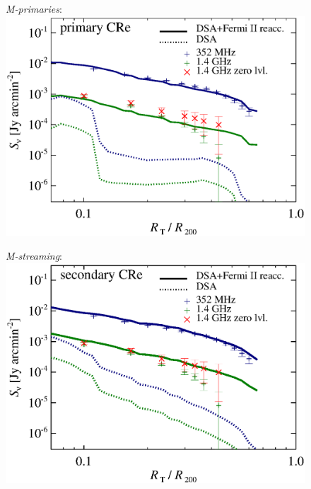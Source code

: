 \documentclass[useAMS,usenatbib]{mn2e}
\newcommand{\Mstream}{{\it M-streaming}\xspace}
\newcommand{\Mprimary}{{\it M-primaries}\xspace}
\begin{document}
\begin{figure}
\begin{minipage}{1\columnwidth}
   \begin{center}\Large{\Mprimary:}\\
     \includegraphics[width=\columnwidth]{figures/sbright.nu.DIIcomp.Pri.g72a.Rad14.2400p.z0.NL.xKR.eb23.eI088.140.v5.halo.test5.eps}
   \end{center}
\end{minipage}
\begin{minipage}{1\columnwidth}
   \begin{center}\Large{\Mstream:}\\
     \includegraphics[width=\columnwidth]{figures/sbright.nu.DIIcomp.flatCR.g72a.Rad14.2400p.z0.NL.xKR.eb23.eI081.flatCR.140.v5.halo.test5.eps}

\end{center}
\end{minipage}
\end{figure}
\end{document}
